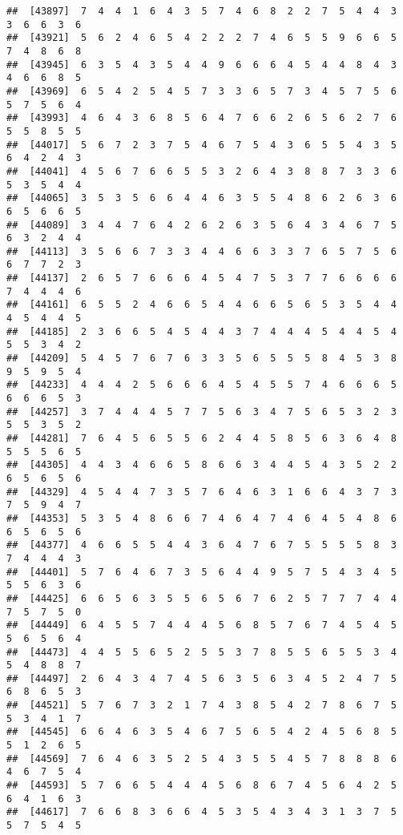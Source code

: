\documentclass[
]{book}
\begin{document}
\begin{verbatim}
##  [43897]  7  4  4  1  6  4  3  5  7  4  6  8  2  2  7  5  4  4  3  3  6  6  3  6
##  [43921]  5  6  2  4  6  5  4  2  2  2  7  4  6  5  5  9  6  6  5  7  4  8  6  8
##  [43945]  6  3  5  4  3  5  4  4  9  6  6  6  4  5  4  4  8  4  3  4  6  6  8  5
##  [43969]  6  5  4  2  5  4  5  7  3  3  6  5  7  3  4  5  7  5  6  5  7  5  6  4
##  [43993]  4  6  4  3  6  8  5  6  4  7  6  6  2  6  5  6  2  7  6  5  5  8  5  5
##  [44017]  5  6  7  2  3  7  5  4  6  7  5  4  3  6  5  5  4  3  5  6  4  2  4  3
##  [44041]  4  5  6  7  6  6  5  5  3  2  6  4  3  8  8  7  3  3  6  5  3  5  4  4
##  [44065]  3  5  3  5  6  6  4  4  6  3  5  5  4  8  6  2  6  3  6  6  5  6  6  5
##  [44089]  3  4  4  7  6  4  2  6  2  6  3  5  6  4  3  4  6  7  5  6  3  2  4  4
##  [44113]  3  5  6  6  7  3  3  4  4  6  6  3  3  7  6  5  7  5  6  6  7  7  2  3
##  [44137]  2  6  5  7  6  6  6  4  5  4  7  5  3  7  7  6  6  6  6  7  4  4  4  6
##  [44161]  6  5  5  2  4  6  6  5  4  4  6  6  5  6  5  3  5  4  4  4  5  4  4  5
##  [44185]  2  3  6  6  5  4  5  4  4  3  7  4  4  4  5  4  4  5  4  5  5  3  4  2
##  [44209]  5  4  5  7  6  7  6  3  3  5  6  5  5  5  8  4  5  3  8  9  5  9  5  4
##  [44233]  4  4  4  2  5  6  6  6  4  5  4  5  5  7  4  6  6  6  5  6  6  6  5  3
##  [44257]  3  7  4  4  4  5  7  7  5  6  3  4  7  5  6  5  3  2  3  5  5  3  5  2
##  [44281]  7  6  4  5  6  5  5  6  2  4  4  5  8  5  6  3  6  4  8  5  5  5  6  5
##  [44305]  4  4  3  4  6  6  5  8  6  6  3  4  4  5  4  3  5  2  2  6  5  6  5  6
##  [44329]  4  5  4  4  7  3  5  7  6  4  6  3  1  6  6  4  3  7  3  7  5  9  4  7
##  [44353]  5  3  5  4  8  6  6  7  4  6  4  7  4  6  4  5  4  8  6  6  5  6  5  6
##  [44377]  4  6  6  5  5  4  4  3  6  4  7  6  7  5  5  5  5  8  3  7  4  4  4  3
##  [44401]  5  7  6  4  6  7  3  5  6  4  4  9  5  7  5  4  3  4  5  5  5  6  3  6
##  [44425]  6  6  5  6  3  5  5  6  5  6  7  6  2  5  7  7  7  4  4  7  5  7  5  0
##  [44449]  6  4  5  5  7  4  4  4  5  6  8  5  7  6  7  4  5  4  5  5  6  5  6  4
##  [44473]  4  4  5  5  6  5  2  5  5  3  7  8  5  5  6  5  5  3  4  5  4  8  8  7
##  [44497]  2  6  4  3  4  7  4  5  6  3  5  6  3  4  5  2  4  7  5  6  8  6  5  3
##  [44521]  5  7  6  7  3  2  1  7  4  3  8  5  4  2  7  8  6  7  5  5  3  4  1  7
##  [44545]  6  6  4  6  3  5  4  6  7  5  6  5  4  2  4  5  6  8  5  5  1  2  6  5
##  [44569]  7  6  4  6  3  5  2  5  4  3  5  5  4  5  7  8  8  8  6  4  6  7  5  4
##  [44593]  5  7  6  6  5  4  4  4  5  6  8  6  7  4  5  6  4  2  5  6  4  1  6  3
##  [44617]  7  6  6  8  3  6  6  4  5  3  5  4  3  4  3  1  3  7  5  5  7  5  4  5

\end{verbatim}
\end{document}
